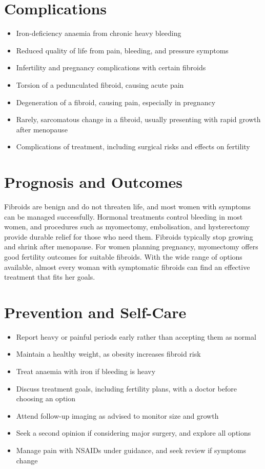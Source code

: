 \section*{Complications}
\begin{itemize}
    \item Iron-deficiency anaemia from chronic heavy bleeding
    \item Reduced quality of life from pain, bleeding, and pressure symptoms
    \item Infertility and pregnancy complications with certain fibroids
    \item Torsion of a pedunculated fibroid, causing acute pain
    \item Degeneration of a fibroid, causing pain, especially in pregnancy
    \item Rarely, sarcomatous change in a fibroid, usually presenting with rapid growth after menopause
    \item Complications of treatment, including surgical risks and effects on fertility
\end{itemize}

\section*{Prognosis and Outcomes}
Fibroids are benign and do not threaten life, and most women with symptoms can be managed successfully. Hormonal treatments control bleeding in most women, and procedures such as myomectomy, embolisation, and hysterectomy provide durable relief for those who need them. Fibroids typically stop growing and shrink after menopause. For women planning pregnancy, myomectomy offers good fertility outcomes for suitable fibroids. With the wide range of options available, almost every woman with symptomatic fibroids can find an effective treatment that fits her goals.

\section*{Prevention and Self-Care}
\begin{itemize}
    \item Report heavy or painful periods early rather than accepting them as normal
    \item Maintain a healthy weight, as obesity increases fibroid risk
    \item Treat anaemia with iron if bleeding is heavy
    \item Discuss treatment goals, including fertility plans, with a doctor before choosing an option
    \item Attend follow-up imaging as advised to monitor size and growth
    \item Seek a second opinion if considering major surgery, and explore all options
    \item Manage pain with NSAIDs under guidance, and seek review if symptoms change
\end{itemize}


